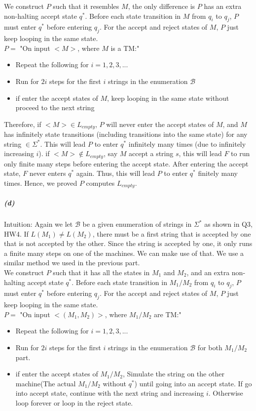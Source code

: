 \documentclass[11pt]{article}
\begin{document}
We construct $P$ such that it resembles $M$, the only difference is $P$ has an extra non-halting accept state $q^*$. Before each state transition in $M$ from $q_i$ to $q_j$, $P$ must enter $q^*$ before entering $q_j$. For the accept and reject states of $M$, $P$ just keep looping in the same state.\\

$P=$ "On input $<M>$, where $M$ is a TM:"
\begin{itemize}
\item Repeat the following for $i = 1,2,3,...$
\item Run for $2i$ steps for the first $i$ strings in the enumeration $\mathcal{B}$
\item if enter the accept states of $M$, keep looping in the same state without proceed to the next string
\end{itemize}

Therefore, if $<M> \in L_{empty}$, $P$ will never enter the accept states of $M$, and $M$ has infinitely state transitions (including transitions into the same state) for any string $\in \Sigma^*$. This will lead $P$ to enter $q^*$ infinitely many times (due to infinitely increasing $i$). if $<M> \not \in L_{empty}$, say $M$ accept a string $s$, this will lead $F$ to run only finite many steps before entering the accept state. After entering the accept state, $F$ never enters $q^*$ again. Thus, this will lead $P$ to enter $q^*$ finitely many times. Hence, we proved $P$ computes $L_{empty}$.
\subparagraph{(d)}
Intuition: Again we let $\mathcal{B}$ be a given enumeration of strings in $\Sigma^*$ as shown in Q3, HW4. If $L(M_1) \neq L(M_2)$, there must be a first string that is accepted by one that is not accepted by the other. Since the string is accepted by one, it only runs a finite many steps on one of the machines. We can make use of that. We use a similar method we used in the previous part. \\

We construct $P$ such that it has all the states in $M_1$ and $M_2$, and an extra non-halting accept state $q^*$. Before each state transition in $M_1/M_2$ from $q_i$ to $q_j$, $P$ must enter $q^*$ before entering $q_j$. For the accept and reject states of $M$, $P$ just keep looping in the same state.\\

$P=$ "On input $<(M_1,M_2)>$, where $M_1/M_2$ are TM:"
\begin{itemize}
\item Repeat the following for $i = 1,2,3,...$
\item Run for $2i$ steps for the first $i$ strings in the enumeration $\mathcal{B}$ for both $M_1/M_2$ part.
\item if enter the accept states of $M_1/M_2$, Simulate the string on the other machine(The actual $M_1/M_2$ without $q^*$) until going into an accept state. If go into accept state, continue with the next string and increasing $i$. Otherwise loop forever or loop in the reject state.
\end{itemize}
\end{document}
